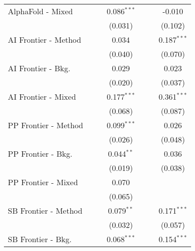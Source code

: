 \begin{tabular}{lcccccc}
   AlphaFold - Mixed    &               &               & 0.086$^{***}$ &               &               & -0.010\\   
                        &               &               & (0.031)       &               &               & (0.102)\\   
   AI Frontier - Method &               &               & 0.034         &               &               & 0.187$^{***}$\\   
                        &               &               & (0.040)       &               &               & (0.070)\\   
   AI Frontier - Bkg.   &               &               & 0.029         &               &               & 0.023\\   
                        &               &               & (0.020)       &               &               & (0.037)\\   
   AI Frontier - Mixed  &               &               & 0.177$^{***}$ &               &               & 0.361$^{***}$\\   
                        &               &               & (0.068)       &               &               & (0.087)\\   
   PP Frontier - Method &               &               & 0.099$^{***}$ &               &               & 0.026\\   
                        &               &               & (0.026)       &               &               & (0.048)\\   
   PP Frontier - Bkg.   &               &               & 0.044$^{**}$  &               &               & 0.036\\   
                        &               &               & (0.019)       &               &               & (0.038)\\   
   PP Frontier - Mixed  &               &               & 0.070         &               &               &   \\   
                        &               &               & (0.065)       &               &               &   \\   
   SB Frontier - Method &               &               & 0.079$^{**}$  &               &               & 0.171$^{***}$\\   
                        &               &               & (0.032)       &               &               & (0.057)\\   
   SB Frontier - Bkg.   &               &               & 0.068$^{***}$ &               &               & 0.154$^{***}$\\   

\end{tabular}
